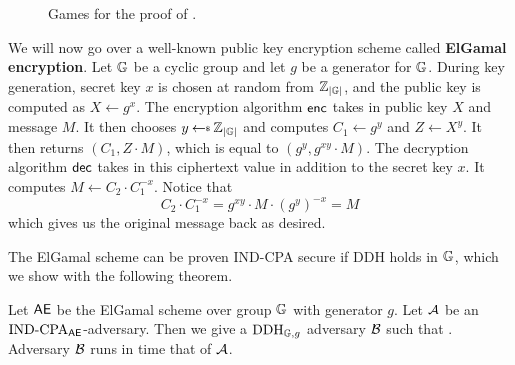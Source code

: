 \begin{wrapfigure}{r}{1.5in}
	\center
	\caption{Games for the proof of .}
	\label{fig:elgamal-games}
\end{wrapfigure}

We will now go over a well-known public key encryption scheme called \textbf{ElGamal encryption}. Let $\mathbb{G}$ be a cyclic group and let $g$ be a generator for $\mathbb{G}$. During key generation, secret key $x$ is chosen at random from ${{\mathbb Z}}_{|\mathbb{G}|}$, and the public key is computed as $X \gets g^x$. The encryption algorithm ${\sf enc}$ takes in public key $X$ and message $M$. It then chooses $y\getsr \Z_{|\group|}$ and computes $C_1 \gets g^y$ and $Z \gets X^y$. It then returns $(C_1, Z \cdot M)$, which is equal to $(g^y, g^{xy} \cdot M)$. The decryption algorithm ${\sf dec}$ takes in this ciphertext value in addition to the secret key $x$. It computes $M \gets C_2 \cdot C_1^{-x}$. Notice that
\begin{equation*}
	C_2 \cdot C_1^{-x} = g^{xy} \cdot M \cdot (g^y)^{-x} = M
\end{equation*}
which gives us the original message back as desired. 

The ElGamal scheme can be proven IND-CPA secure if DDH holds in $\mathbb{G}$, which we show with the following theorem. 

\begin{theorem}
\label{proof:elgamal}
	Let $\textsf{AE}$ be the ElGamal scheme over group $\mathbb{G}$ with generator $g$. 
	Let ${\mathcal A}$ be an $\textnormal{IND-CPA}_{\textsf{AE}}$-adversary. Then we give a $\textnormal{DDH}_{\mathbb{G},g}$ 
	adversary ${\mathcal B}$ such that 
	\bnm
	\AdvINDCPA{\AEnc}{\advA} \cdotsm {} \;.
	\enm
	Adversary ${\mathcal B}$ runs in time that of ${\mathcal A}$. 
\end{theorem} 
	
